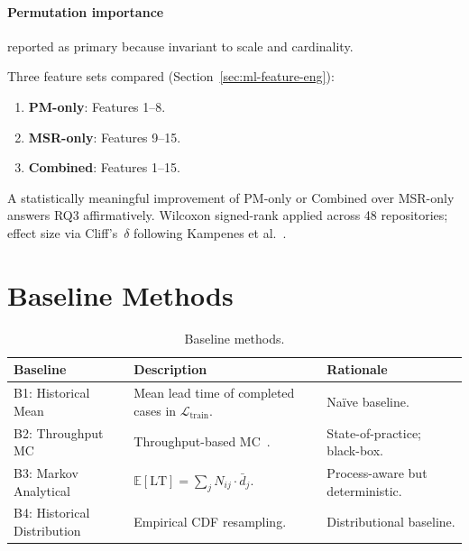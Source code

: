 \paragraph{Permutation importance} reported as primary because invariant
to scale and cardinality.

Three feature sets compared (Section~\ref{sec:ml-feature-eng}):
\begin{enumerate}
  \item \textbf{PM-only}: Features 1--8.
  \item \textbf{MSR-only}: Features 9--15.
  \item \textbf{Combined}: Features 1--15.
\end{enumerate}

A statistically meaningful improvement of PM-only or Combined over
MSR-only answers RQ3 affirmatively. Wilcoxon signed-rank applied across
48 repositories; effect size via Cliff's~$\delta$ following
Kampenes et al.~\cite{kampenes2007systematic}.


\section{Baseline Methods}
\label{sec:baselines}

\begin{table}[htbp]
\centering
\caption{Baseline methods.}
\label{tab:baselines}
\small
\begin{tabular}{lp{4cm}p{5cm}}
\toprule
\textbf{Baseline} & \textbf{Description} & \textbf{Rationale} \\
\midrule
B1: Historical Mean         & Mean lead time of completed cases in $\mathcal{L}_{\text{train}}$. & Naïve baseline. \\
\midrule
B2: Throughput MC           & Throughput-based MC~\cite{vacanti2015,savage2009flaw,magennis2015forecasting}. & State-of-practice; black-box. \\
\midrule
B3: Markov Analytical       & $\mathbb{E}[\text{LT}] = \sum_j N_{ij} \cdot \bar{d}_j$. & Process-aware but deterministic. \\
\midrule
B4: Historical Distribution & Empirical CDF resampling. & Distributional baseline. \\
\bottomrule
\end{tabular}
\end{table}

